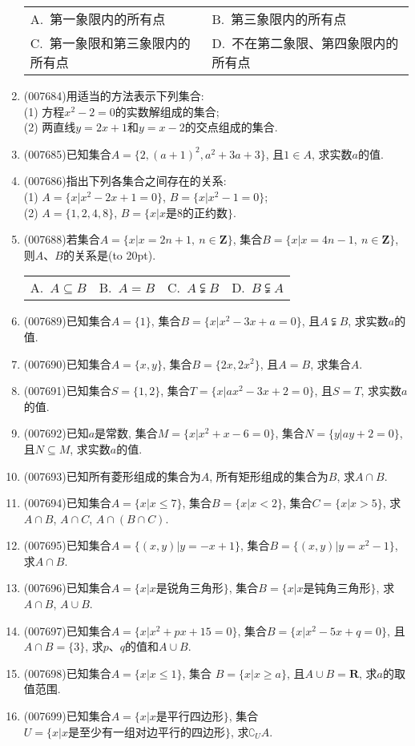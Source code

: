 \documentclass[10pt,a4paper]{article}
\newcommand{\bracket}[1]{(\hbox to #1pt{})}
\newcommand{\twoch}[4]{\par\begin{tabular}{p{.46\textwidth}p{.46\textwidth}}
A.~#1& B.~#2\\
C.~#3& D.~#4
\end{tabular}}
\newcommand{\fourch}[4]{\par\begin{tabular}{p{.23\textwidth}p{.23\textwidth}p{.23\textwidth}p{.23\textwidth}}
A.~#1 &B.~#2& C.~#3& D.~#4
\end{tabular}}
\begin{document}
\begin{enumerate}[1.]
\twoch{第一象限内的所有点}{第三象限内的所有点}{第一象限和第三象限内的所有点}{不在第二象限、第四象限内的所有点}
\item {\tiny (007684)}用适当的方法表示下列集合:\\
(1) 方程$x^2-2=0$的实数解组成的集合;\\
(2) 两直线$y=2x+1$和$y=x-2$的交点组成的集合.
\item {\tiny (007685)}已知集合$A=\{2,(a+1)^2,a^2+3a+3\}$, 且$1\in A$, 求实数$a$的值.
\item {\tiny (007686)}指出下列各集合之间存在的关系:\\
(1) $A=\{x|x^2-2x+1=0\}$, $B=\{x|x^2-1=0\}$;\\
(2) $A=\{1,2,4,8\}$, $B=\{x|x\text{是}8\text{的正约数}\}$.
\item {\tiny (007688)}若集合$A=\{x|x=2n+1, \ n\in \mathbf{Z}\}$, 集合$B=\{x|x=4n-1, \ n\in \mathbf{Z}\}$, 则$A$、$B$的关系是\bracket{20}.
\fourch{$A\subseteq B$}{$A=B$}{$A\subsetneqq B$}{$B\subsetneqq A$}
\item {\tiny (007689)}已知集合$A=\{1\}$, 集合$B=\{x|x^2-3x+a=0\}$, 且$A\subsetneqq B$, 求实数$a$的值.
\item {\tiny (007690)}已知集合$A=\{x,y\}$, 集合$B=\{2x,2x^2\}$, 且$A=B$, 求集合$A$.
\item {\tiny (007691)}已知集合$S=\{1,2\}$, 集合$T=\{x|ax^2-3x+2=0\}$, 且$S=T$, 求实数$a$的值.
\item {\tiny (007692)}已知$a$是常数, 集合$M=\{x|x^2+x-6=0\}$, 集合$N=\{y|ay+2=0\}$, 且$N\subseteq M$, 求实数$a$的值.
\item {\tiny (007693)}已知所有菱形组成的集合为$A$, 所有矩形组成的集合为$B$, 求$A\cap B$.
\item {\tiny (007694)}已知集合$A=\{x|x\le 7\}$, 集合$B=\{x|x<2\}$, 集合$C=\{x|x>5\}$, 求$A\cap B$, $A\cap C$, $A\cap (B\cap C)$.
\item {\tiny (007695)}已知集合$A=\{(x,y)|y=-x+1\}$, 集合$B=\{(x,y)|y=x^2-1\}$, 求$A\cap B$.
\item {\tiny (007696)}已知集合$A=\{x|x\text{是锐角三角形}\}$, 集合$B=\{x|x\text{是钝角三角形}\}$, 求$A\cap B$, $A\cup B$.
\item {\tiny (007697)}已知集合$A=\{x|x^2+px+15=0\}$, 集合$B=\{x|x^2-5x+q=0\}$, 且$A\cap B=\{3\}$, 求$p$、$q$的值和$A\cup B$.
\item {\tiny (007698)}已知集合$A=\{x|x\le 1\}$, 集合 $B=\{x|x\ge a\}$, 且$A\cup B=\mathbf{R}$, 求$a$的取值范围.
\item {\tiny (007699)}已知集合$A=\{x|x\text{是平行四边形}\}$, 集合$U=\{x|x\text{是至少有一组对边平行的四边形}\}$, 求$\complement _UA$.

\end{enumerate}
\end{document}
